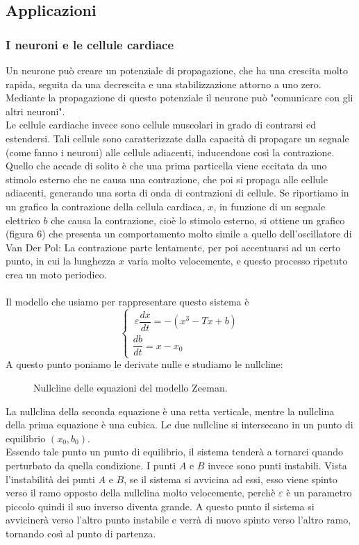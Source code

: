 \documentclass[12pt]{article}
\begin{document}
\subsection{Applicazioni}
\subsubsection{I neuroni e le cellule cardiace}
Un neurone può creare un potenziale di propagazione, che ha una crescita molto rapida, seguita da una decrescita e una stabilizzazione attorno a uno zero. Mediante la propagazione di questo potenziale il neurone può "comunicare con gli altri neuroni". \\
Le cellule cardiache invece sono cellule muscolari in grado di contrarsi ed estendersi. Tali cellule sono caratterizzate dalla capacità di propagare un segnale (come fanno i neuroni) alle cellule adiacenti, inducendone così la contrazione. Quello che accade di solito è che una prima particella viene eccitata da uno stimolo esterno che ne causa una contrazione, che poi si propaga alle cellule adiacenti, generando una sorta di onda di contrazioni di cellule. Se riportiamo in un grafico la contrazione della cellula cardiaca, $x$, in funzione di un segnale elettrico $b$ che causa la contrazione, cioè lo stimolo esterno, si ottiene un grafico (figura 6) che presenta un comportamento molto simile a quello dell'oscillatore di Van Der Pol:
La contrazione parte lentamente, per poi accentuarsi ad un certo punto, in cui la lunghezza $x$ varia molto velocemente, e questo processo ripetuto crea un moto periodico. \\ \\
Il modello che usiamo per rappresentare questo sistema è
\begin{equation}
	\begin{cases}
		\ \varepsilon \dfrac{dx}{dt} = -(x^3 - Tx + b) \\
		\dfrac{db}{dt} = x - x_0
	\end{cases}
\end{equation}
A questo punto poniamo le derivate nulle e studiamo le nullcline: 
\begin{figure}[H]
	\centering
	
	\caption{Nullcline delle equazioni del modello Zeeman.}
\end{figure}
La nullclina della seconda equazione è una retta verticale, mentre la nullclina della prima equazione è una cubica. Le due nullcline si intersecano in un punto di equilibrio $(x_0,b_0)$. \\ 
Essendo tale punto un punto di equilibrio, il sistema tenderà a tornarci quando perturbato da quella condizione. I punti $A$ e $B$ invece sono punti instabili. Vista l'instabilità dei punti $A$ e $B$, se il sistema si avvicina ad essi, esso viene spinto verso il ramo opposto della nullclina molto velocemente, perchè $\varepsilon$ è un parametro piccolo quindi il suo inverso diventa grande. A questo punto il sistema si avvicinerà verso l'altro punto instabile e verrà di nuovo spinto verso l'altro ramo, tornando così al punto di partenza. \\ \\
\end{document}
